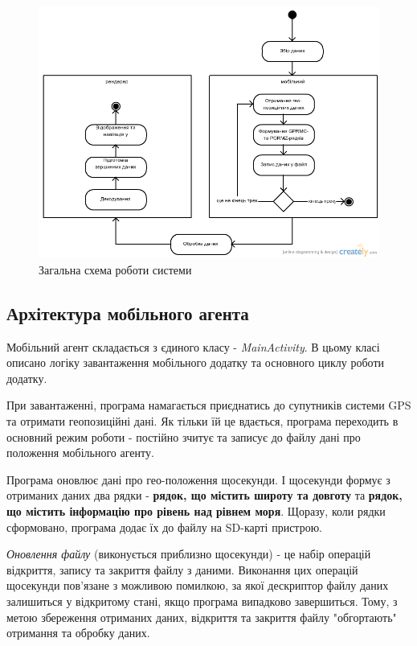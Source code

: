 \documentclass[simple,a4paper,14pt,ukrainian,utf8]{eskdtext}
\begin{document}
	\vspace{3em}
	\begin{figure}	
		\centering \includegraphics[scale=0.5]{images/general_workflow.png}
		\caption{Загальна схема роботи системи}
	\end{figure}

	\subsection{Архітектура мобільного агента}
	
	Мобільний агент складається з єдиного класу - \textit{MainActivity}. В цьому класі описано логіку завантаження мобільного додатку та основного циклу роботи додатку.
	
	При завантаженні, програма намагається приєднатись до супутників системи GPS та отримати геопозиційні дані. Як тільки їй це вдається, програма переходить в основний режим роботи - постійно зчитує та записує до файлу дані про положення мобільного агенту.
	
	Програма оновлює дані про гео-положення щосекунди. І щосекунди формує з отриманих даних два рядки - \textbf{рядок, що містить широту та довготу} та \textbf{рядок, що містить інформацію про рівень над рівнем моря}. Щоразу, коли рядки сформовано, програма додає їх до файлу на SD-карті пристрою.
	
	\textit{Оновлення файлу} (виконується приблизно щосекунди) - це набір операцій відкриття, запису та закриття файлу з даними. Виконання цих операцій щосекунди пов’язане з можливою помилкою, за якої дескриптор файлу даних залишиться у відкритому стані, якщо програма випадково завершиться. Тому, з метою збереження отриманих даних, відкриття та закриття файлу "обгортають" отримання та обробку даних.
	
\end{document}
